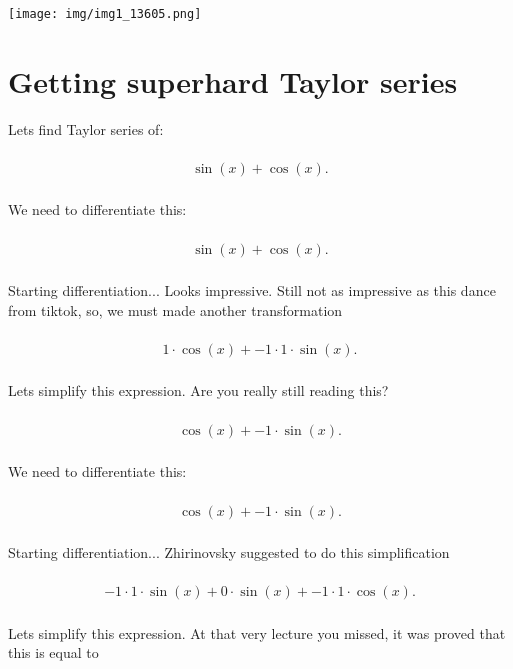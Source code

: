 \documentclass[12pt,a4paper]{extreport}
\begin{document}
\texttt{[image: img/img1\_13605.png]}
\section{Getting superhard Taylor series}

Lets find Taylor series of:


\begin{multline}
\\
\sin(x) + \cos(x).\\
\end{multline}


We need to differentiate this:


\begin{multline}
\\
\sin(x) + \cos(x).\\
\end{multline}


Starting differentiation... 
Looks impressive. Still not as impressive as this dance from tiktok\cite{Zolo}, so, we must made another transformation 

\begin{multline}
\\
1 \cdot \cos(x) + -1 \cdot 1 \cdot \sin(x).\\
\end{multline}


Lets simplify this expression.
Are you really still reading this? 

\begin{multline}
\\
\cos(x) + -1 \cdot \sin(x).\\
\end{multline}


We need to differentiate this:


\begin{multline}
\\
\cos(x) + -1 \cdot \sin(x).\\
\end{multline}


Starting differentiation... 
Zhirinovsky suggested \cite{Zhirinovsky} to do this simplification 

\begin{multline}
\\
-1 \cdot 1 \cdot \sin(x) + 0 \cdot \sin(x) + -1 \cdot 1 \cdot \cos(x).\\
\end{multline}


Lets simplify this expression.
At that very lecture you missed, it was proved that this is equal to 
\end{document}
